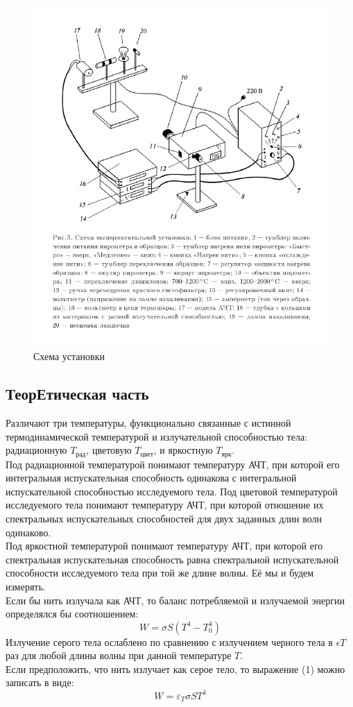 \documentclass[a4paper,12pt]{article}
\theoremstyle{plain} %
\theoremstyle{definition} %
\theoremstyle{remark} %
\begin{document}
\begin{figure}[h]
        \includegraphics[width=0.7 \textwidth]{Materials/scheme.jpg}
    \caption{Схема установки}
\end{figure}

\subsection{ТеорЕтическая часть}
\indent Различают три температуры, функционально связанные с истинной термодинамической температурой и излучательной способностью тела: радиационную $T_\text{рад}$, цветовую $T_\text{цвет}$, и яркостную
$T_\text{ярк}$.\\
\indent Под радиационной температурой понимают температуру АЧТ, при которой его интегральная испускательная способность одинакова с интегральной испускательной способностью исследуемого тела.
Под цветовой температурой исследуемого тела понимают температуру АЧТ, при которой отношение их спектральных испускательных способностей для двух заданных длин волн одинаково.\\
\indent Под яркостной температурой понимают температуру АЧТ, при которой его спектральная испускательная способность равна спектральной испускательной способности исследуемого тела при той же длине волны. Её мы и будем измерять. \\
\indent Если бы нить излучала как АЧТ, то баланс потребляемой и излучаемой энергии определялся бы соотношением:
\begin{equation}
    W = \sigma S (T^4 - T_0^4)
\end{equation}
\indent Излучение серого тела ослаблено по сравнению с излучением черного тела в $\epsilon T$ раз для любой длины волны при данной температуре $T$.\\
\indent Если предположить, что нить излучает как серое тело, то выражение (1) можно записать в виде:
\begin{equation}
    W = \varepsilon_T \sigma S T^4
\end{equation}
\end{document}
